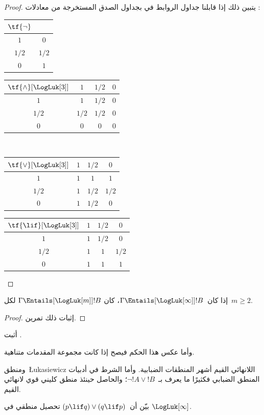 \documentclass[../../../include/open-logic-section]{subfiles}
\begin{document}
\begin{proof}
  يتبين ذلك إذا قابلنا جداول الروابط في
   بجداول الصدق المستخرجة من
  معادلات :
  \begin{center}
    \begin{tabular}{c|c}
      $\tf{\lnot}$ & \\
      \hline
      $1$ & $0$ \\
      $1/2$ & $1/2$ \\
      $0$ & $1$
    \end{tabular}
    \quad
    \begin{tabular}{c|ccc}
      $\tf{\land}[\LogLuk[3]]$ & $1$ & $1/2$ & $0$ \\
      \hline
      $1$ & $1$ & $1/2$ & $0$ \\
      $1/2$ & $1/2$ & $1/2$ & $0$\\
      $0$ & $0$ & $0$ & $0$
    \end{tabular}
    \\[2ex]
    \begin{tabular}{c|ccc}
      $\tf{\lor}[\LogLuk[3]]$ & $1$ & $1/2$ & $0$ \\
      \hline
      $1$ & $1$ & $1$ & $1$ \\
      $1/2$ & $1$ & $1/2$ & $1/2$ \\
      $0$ & $1$ & $1/2$ & $0$
    \end{tabular}
    \quad
    \begin{tabular}{c|ccc}
      $\tf{\lif}[\LogLuk[3]]$ & $1$ & $1/2$ & $0$ \\
      \hline
      $1$ & $1$ & $1/2$ & $0$ \\
      $1/2$ & $1$ & $1$ & $1/2$  \\
      $0$ & $1$ & $1$ & $1$
    \end{tabular}
  \end{center}
\end{proof}

\begin{prop}
  إذا كان~$\Gamma \Entails[\LogLuk[\infty]] !B$، كان
  $\Gamma \Entails[\LogLuk[m]] !B$ لكل~$m \ge 2$.
\end{prop}

\begin{proof}
  إثبات ذلك تمرين.
\end{proof}

\begin{prob}
  أثبت .
\end{prob}

وأما عكس هذا الحكم فيصح إذا كانت مجموعة المقدمات متناهية.

ومنطق~\L ukasiewicz اللانهائي القيم أشهر المنطقات الضبابية. وأما
الشرط في أدبيات المنطق الضبابي فكثيرًا ما يعرف بـ~$\lnot !A \lor !B$؛
والحاصل حينئذ منطق كليني قوي لانهائي القيم.

\begin{prob}
  بيّن أن~$(p \lif q) \lor (q \lif p)$ تحصيل منطقي في
  $\LogLuk[\infty]$.
\end{prob}
\end{document}

